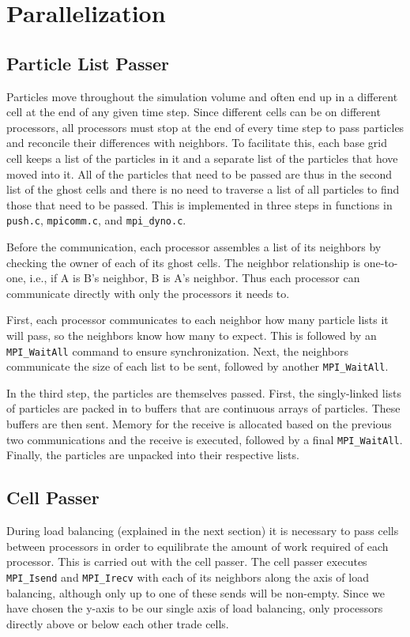 \documentclass[]{article}
\begin{document}
\section{Parallelization}

\subsection{Particle List Passer}
Particles move throughout the simulation volume and often end up in a different cell at the end of any given time step.  Since different cells can be on different processors, all processors must stop at the end of every time step to pass particles and reconcile their differences with neighbors.  To facilitate this, each base grid cell keeps a list of the particles in it and a separate list of the particles that hove moved into it.  All of the particles that need to be passed are thus in the second list of the ghost cells and there is no need to traverse a list of all particles to find those that need to be passed.  This is implemented in three steps in functions in \texttt{push.c}, \texttt{mpicomm.c}, and \texttt{mpi\_dyno.c}.

Before the communication, each processor assembles a list of its neighbors by checking the owner of each of its ghost cells.  The neighbor relationship is one-to-one, i.e., if A is B's neighbor, B is A's neighbor.  Thus each processor can communicate directly with only the processors it needs to.

First, each processor communicates to each neighbor how many particle lists it will pass, so the neighbors know how many to expect.  This is followed by an \texttt{MPI\_WaitAll} command to ensure synchronization.  Next, the neighbors communicate the size of each list to be sent, followed by another \texttt{MPI\_WaitAll}.

In the third step, the particles are themselves passed.  First, the singly-linked lists of particles are packed in to buffers that are continuous arrays of particles.  These buffers are then sent.  Memory for the receive is allocated based on the previous two communications and the receive is executed, followed by a final \texttt{MPI\_WaitAll}.  Finally, the particles are unpacked into their respective lists.

\subsection{Cell Passer}
During load balancing (explained in the next section) it is necessary to pass cells between processors in order to equilibrate the amount of work required of each processor. This is carried out with the cell passer. The cell passer executes \texttt{MPI\_Isend} and \texttt{MPI\_Irecv} with each of its neighbors along the axis of load balancing, although only up to one of these sends will be non-empty. Since we have chosen the y-axis to be our single axis of load balancing, only processors directly above or below each other trade cells. 
\end{document}
